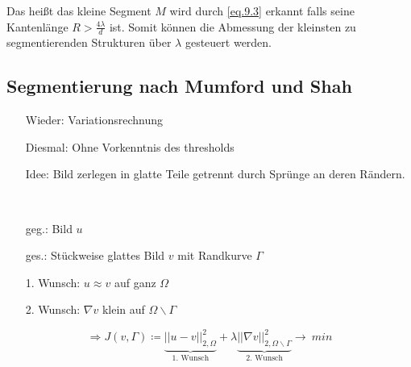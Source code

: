 \documentclass[ngerman]{article}
\theoremstyle{plain}
\theoremstyle{definition}
\numberwithin{equation}{section}
\newcommand{\norm}[1] {
\left|\left| #1 \right|\right|
}
\newcommand{\quo}[1] {
\glqq #1 \grqq
}
\begin{document}
Das heißt das kleine Segment $M$ wird durch \ref{eq.9.3} \quo{erkannt} falls seine Kantenlänge $R>\frac{4 \lambda}{d}$ ist. Somit können die Abmessung der kleinsten zu segmentierenden Strukturen über $\lambda$ gesteuert werden.

\subsection{Segmentierung nach Mumford und Shah}

\begin{minipage}{.65\textwidth}
    \begin{enumerate}
        \item[Wieder:] Variationsrechnung
        \item[Diesmal:] Ohne Vorkenntnis des thresholds
        \item[Idee:] Bild zerlegen in \quo{glatte} Teile getrennt durch Sprünge an deren Rändern.
        \item[] \
        \item[geg.:] Bild $u$
        \item[ges.:] Stückweise glattes Bild $v$ mit Randkurve $\Gamma$
    \end{enumerate}
    \begin{enumerate}
        \item[1. Wunsch:] $u \approx v$ auf ganz $\Omega$
        \item[2. Wunsch:] $\nabla v$ klein auf $\Omega \backslash \Gamma$
    \end{enumerate}
\end{minipage}%
\begin{minipage}{0.3\textwidth}
\begin{center}
\end{center}
\end{minipage}

\[\Rightarrow J(v,\Gamma)  \coloneqq  \underbrace{\norm{u-v}_{2,\Omega}^2}_{1. \text{ Wunsch}}  + \lambda \underbrace{\norm{\nabla v}_{2,\Omega \backslash \Gamma}^2}_{2. \text{ Wunsch}} \to \ min \]
\end{document}
